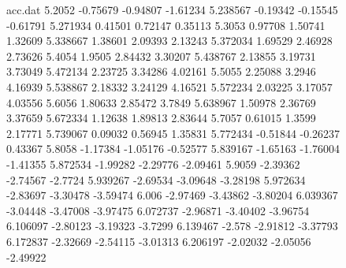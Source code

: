 \begin{figure}[H]
\begin{filecontents}{acc.dat}
                5.2052	-0.75679	-0.94807	-1.61234
                5.238567	-0.19342	-0.15545	-0.61791
                5.271934	0.41501	0.72147	0.35113
                5.3053	0.97708	1.50741	1.32609
                5.338667	1.38601	2.09393	2.13243
                5.372034	1.69529	2.46928	2.73626
                5.4054	1.9505	2.84432	3.30207
                5.438767	2.13855	3.19731	3.73049
                5.472134	2.23725	3.34286	4.02161
                5.5055	2.25088	3.2946	4.16939
                5.538867	2.18332	3.24129	4.16521
                5.572234	2.03225	3.17057	4.03556
                5.6056	1.80633	2.85472	3.7849
                5.638967	1.50978	2.36769	3.37659
                5.672334	1.12638	1.89813	2.83644
                5.7057	0.61015	1.3599	2.17771
                5.739067	0.09032	0.56945	1.35831
                5.772434	-0.51844	-0.26237	0.43367
                5.8058	-1.17384	-1.05176	-0.52577
                5.839167	-1.65163	-1.76004	-1.41355
                5.872534	-1.99282	-2.29776	-2.09461
                5.9059	-2.39362	-2.74567	-2.7724
                5.939267	-2.69534	-3.09648	-3.28198
                5.972634	-2.83697	-3.30478	-3.59474
                6.006	-2.97469	-3.43862	-3.80204
                6.039367	-3.04448	-3.47008	-3.97475
                6.072737	-2.96871	-3.40402	-3.96754
                6.106097	-2.80123	-3.19323	-3.7299
                6.139467	-2.578	-2.91812	-3.37793
                6.172837	-2.32669	-2.54115	-3.01313
                6.206197	-2.02032	-2.05056	-2.49922                    
            \end{filecontents}
        

\end{figure}
